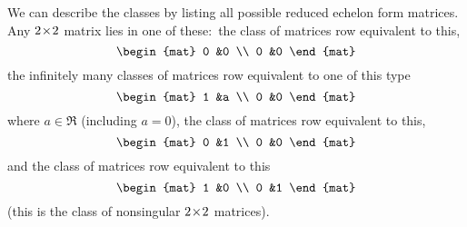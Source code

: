\begin{example} \label{ex:RowEqClassTwoTwoMats}
We can describe the classes by listing all possible
reduced echelon form matrices.
Any $2 \! \times \! 2$ matrix lies in one of these:~the class of matrices
row equivalent to this,
\begin{equation*}
  \begin{mat}
     0  &0  \\
     0  &0
  \end{mat}
\end{equation*}
the infinitely many classes of matrices row equivalent to one of this type
\begin{equation*}
  \begin{mat}
     1  &a  \\
     0  &0
  \end{mat}
\end{equation*}
where \( a\in\Re \) (including $a=0$),
the class of matrices row equivalent to this,
\begin{equation*}
  \begin{mat}
     0  &1  \\
     0  &0
  \end{mat}
\end{equation*}
and the class of matrices row equivalent to this
\begin{equation*}
  \begin{mat}
     1  &0  \\
     0  &1
  \end{mat}
\end{equation*}
(this is the class of nonsingular $2 \! \times \! 2$ matrices).
\end{example}



